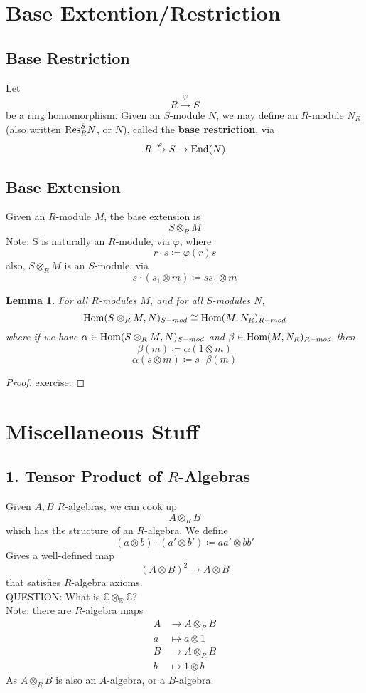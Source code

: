 \documentclass[12pt]{article}
\newcommand{\cx}{\mathbb{C}}
\newcommand{\ita}[1]{\textit{#1}}
\newcommand{\ho}[2]{\textup{Hom}(#1,#2)}
\newcommand{\en}[1]{\textup{End}(#1)}
\newcommand\en{\ita{n }}
\newcommand{\mapp}[4]{\begin{align*}
#1 &\to #2\\
#3 & \mapsto #4
\end{align*}}
\def\r{\mathbb{R}}
\newtheorem{lemma}[theorem]{Lemma}
\theoremstyle{definition}
\begin{document}
\section*{Base Extention/Restriction}
\subsection*{Base Restriction}
Let 
\[
R \xrightarrow{\varphi} S
\]
be a ring homomorphism. Given an $S$-module $N$, we may define an $R$-module $N_R$ (also written $\textup{Res}_R^SN$, or $N$), called the \textbf{base restriction}, via
\[
R \xrightarrow{\varphi} S \rightarrow \en{N}
\]
\subsection*{Base Extension}
Given an $R$-module $M$, the base extension is
\[
S \otimes_R M
\]
Note: S is naturally an $R$-module, via $\varphi$, where
\[
r\cdot s \coloneqq \varphi(r)s
\]
also, $S \otimes_R M$ is an $S$-module, via
\[
s \cdot (s_1 \otimes m) \coloneqq ss_1 \otimes m
\]

\begin{lemma}
For all $R$-modules $M$, and for all $S$-modules $N$, 
\[
\ho{S\otimes_R M}{N}_{S-mod} \cong \ho{M}{N_R}_{R-mod}
\]
where if we have $\alpha \in \ho{S\otimes_R M}{N}_{S-mod}$ and $\beta \in \ho{M}{N_R}_{R-mod}$ then
\[
\beta(m) \coloneqq \alpha(1 \otimes m)
\]
\[
\alpha(s \otimes m) \coloneqq s \cdot \beta(m)
\]
\end{lemma}
\begin{proof}
exercise.
\end{proof}

\section*{Miscellaneous Stuff}
\subsection*{1. Tensor Product of $R$-Algebras}
Given $A,B$ $R$-algebras, we can cook up
\[
A \otimes_R B
\]
which has the structure of an $R$-algebra. We define
\[
(a\otimes b) \cdot (a' \otimes b') \coloneqq aa' \otimes bb'
\]
Gives a well-defined map 
\[
(A \otimes B)^2 \rightarrow A \otimes B
\]
that satisfies $R$-algebra axioms.\\
QUESTION: What is $\cx \otimes_\r \cx$?\\
Note: there are $R$-algebra maps
\[
\mapp{A}{A\otimes_R B}{a}{a\otimes 1}
\]
\[
\mapp{B}{A\otimes_R B}{b}{1 \otimes b}
\]
As $A \otimes_R B$ is also an $A$-algebra, or a $B$-algebra.
\end{document}
